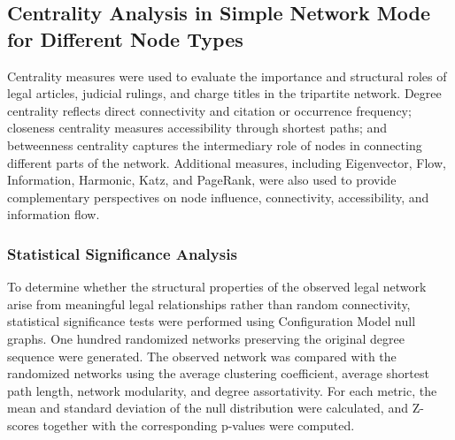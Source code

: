 \documentclass[twoside]{article}
\begin{document}
\subsection{Centrality Analysis in Simple Network Mode for Different Node Types}

Centrality measures were used to evaluate the importance and structural roles of legal articles, judicial rulings, and charge titles in the tripartite network. Degree centrality reflects direct connectivity and citation or occurrence frequency; closeness centrality measures accessibility through shortest paths; and betweenness centrality captures the intermediary role of nodes in connecting different parts of the network. Additional measures, including Eigenvector, Flow, Information, Harmonic, Katz, and PageRank, were also used to provide complementary perspectives on node influence, connectivity, accessibility, and information flow.

\subsubsection{Statistical Significance Analysis}
To determine whether the structural properties of the observed legal network arise from meaningful legal relationships rather than random connectivity, statistical significance tests were performed using Configuration Model null graphs. One hundred randomized networks preserving the original degree sequence were generated. The observed network was compared with the randomized networks using the average clustering coefficient, average shortest path length, network modularity, and degree assortativity. For each metric, the mean and standard deviation of the null distribution were calculated, and Z-scores together with the corresponding p-values were computed.
\end{document}
